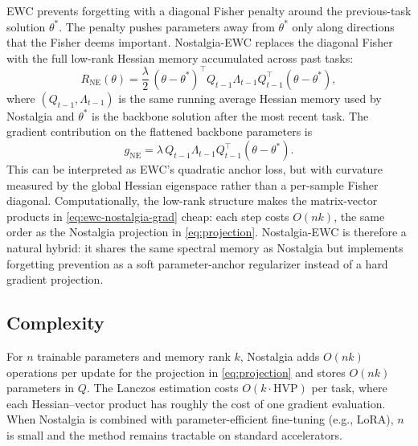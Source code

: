 EWC \cite{Kirkpatrick_2017} prevents forgetting with a diagonal Fisher penalty around the previous-task solution $\theta^*$. The penalty pushes parameters away from $\theta^*$ only along directions that the Fisher deems important. Nostalgia-EWC replaces the diagonal Fisher with the full low-rank Hessian memory accumulated across past tasks:
\begin{equation}
R_{\mathrm{NE}}(\theta) = \frac{\lambda}{2}\,(\theta - \theta^*)^\top Q_{t-1} \Lambda_{t-1} Q_{t-1}^\top (\theta - \theta^*),
\label{eq:ewc-nostalgia-loss}
\end{equation}
where $(Q_{t-1}, \Lambda_{t-1})$ is the same running average Hessian memory used by Nostalgia and $\theta^*$ is the backbone solution after the most recent task. The gradient contribution on the flattened backbone parameters is
\begin{equation}
g_{\mathrm{NE}} = \lambda\, Q_{t-1}^{} \Lambda_{t-1}^{} Q_{t-1}^\top (\theta - \theta^*).
\label{eq:ewc-nostalgia-grad}
\end{equation}
This can be interpreted as EWC's quadratic anchor loss, but with curvature measured by the global Hessian eigenspace rather than a per-sample Fisher diagonal. Computationally, the low-rank structure makes the matrix-vector products in \eqref{eq:ewc-nostalgia-grad} cheap: each step costs $O(nk)$, the same order as the Nostalgia projection in \eqref{eq:projection}. Nostalgia-EWC is therefore a natural hybrid: it shares the same spectral memory as Nostalgia but implements forgetting prevention as a soft parameter-anchor regularizer instead of a hard gradient projection.

\subsection{Complexity}

For $n$ trainable parameters and memory rank $k$, Nostalgia adds $O(nk)$ operations per update for the projection in \eqref{eq:projection} and stores $O(nk)$ parameters in $Q$. The Lanczos estimation costs $O(k \cdot \mathrm{HVP})$ per task, where each Hessian--vector product has roughly the cost of one gradient evaluation. When Nostalgia is combined with parameter-efficient fine-tuning (e.g., LoRA), $n$ is small and the method remains tractable on standard accelerators.

